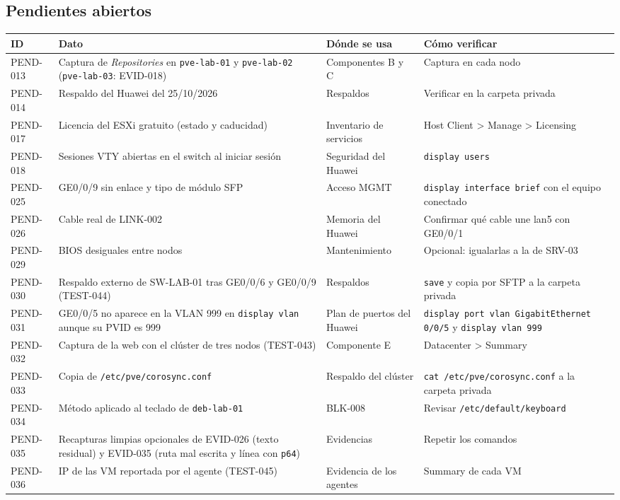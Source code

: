 \documentclass[11pt,a4paper]{article}
\newcommand{\cab}{\rowcolor{light}}
\begin{document}
\subsection{Pendientes abiertos}
{\small
\begin{longtable}{L{1.6cm} L{4.9cm} L{3.2cm} L{5.0cm}}
  \toprule
  \cab\textbf{ID} & \textbf{Dato} & \textbf{Dónde se usa} & \textbf{Cómo verificar}\\
  \midrule
  \endhead
  PEND-013 & Captura de \emph{Repositories} en \texttt{pve-lab-01} y \texttt{pve-lab-02} (\texttt{pve-lab-03}: EVID-018) & Componentes B y C & Captura en cada nodo\\
  PEND-014 & Respaldo del Huawei del 25/10/2026 & Respaldos & Verificar en la carpeta privada\\
  PEND-017 & Licencia del ESXi gratuito (estado y caducidad) & Inventario de servicios & Host Client > Manage > Licensing\\
  PEND-018 & Sesiones VTY abiertas en el switch al iniciar sesión & Seguridad del Huawei & \texttt{display users}\\
  PEND-025 & GE0/0/9 sin enlace y tipo de módulo SFP & Acceso MGMT & \texttt{display interface brief} con el equipo conectado\\
  PEND-026 & Cable real de LINK-002 & Memoria del Huawei & Confirmar qué cable une lan5 con GE0/0/1\\
  PEND-029 & BIOS desiguales entre nodos & Mantenimiento & Opcional: igualarlas a la de SRV-03\\
  PEND-030 & Respaldo externo de SW-LAB-01 tras GE0/0/6 y GE0/0/9 (TEST-044) & Respaldos & \texttt{save} y copia por SFTP a la carpeta privada\\
  PEND-031 & GE0/0/5 no aparece en la VLAN 999 en \texttt{display vlan} aunque su PVID es 999 & Plan de puertos del Huawei & \texttt{display port vlan GigabitEthernet 0/0/5} y \texttt{display vlan 999}\\
  PEND-032 & Captura de la web con el clúster de tres nodos (TEST-043) & Componente E & Datacenter > Summary\\
  PEND-033 & Copia de \texttt{/etc/pve/corosync.conf} & Respaldo del clúster & \texttt{cat /etc/pve/corosync.conf} a la carpeta privada\\
  PEND-034 & Método aplicado al teclado de \texttt{deb-lab-01} & BLK-008 & Revisar \texttt{/etc/default/keyboard}\\
  PEND-035 & Recapturas limpias opcionales de EVID-026 (texto residual) y EVID-035 (ruta mal escrita y línea con \texttt{p64}) & Evidencias & Repetir los comandos\\
  PEND-036 & IP de las VM reportada por el agente (TEST-045) & Evidencia de los agentes & Summary de cada VM\\
  \bottomrule
\end{longtable}
}
\end{document}
